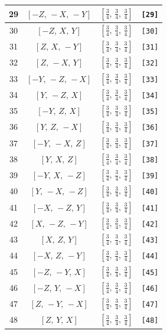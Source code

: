 \documentclass[fleqn,8pt]{jsarticle}
\begin{document}
\begin{longtable}{cccc}
29 & $\left[ - Z,\, - X,\, - Y \right]$ & $\left[ \frac{3}{4},\, \frac{3}{4},\, \frac{3}{4} \right]$ & {\tt [29]} \\ \hline
30 & $\left[ - Z,\, X,\, Y \right]$ & $\left[ \frac{3}{4},\, \frac{3}{4},\, \frac{3}{4} \right]$ & {\tt [30]} \\ \hline
31 & $\left[ Z,\, X,\, - Y \right]$ & $\left[ \frac{3}{4},\, \frac{3}{4},\, \frac{3}{4} \right]$ & {\tt [31]} \\ \hline
32 & $\left[ Z,\, - X,\, Y \right]$ & $\left[ \frac{3}{4},\, \frac{3}{4},\, \frac{3}{4} \right]$ & {\tt [32]} \\ \hline
33 & $\left[ - Y,\, - Z,\, - X \right]$ & $\left[ \frac{3}{4},\, \frac{3}{4},\, \frac{3}{4} \right]$ & {\tt [33]} \\ \hline
34 & $\left[ Y,\, - Z,\, X \right]$ & $\left[ \frac{3}{4},\, \frac{3}{4},\, \frac{3}{4} \right]$ & {\tt [34]} \\ \hline
35 & $\left[ - Y,\, Z,\, X \right]$ & $\left[ \frac{3}{4},\, \frac{3}{4},\, \frac{3}{4} \right]$ & {\tt [35]} \\ \hline
36 & $\left[ Y,\, Z,\, - X \right]$ & $\left[ \frac{3}{4},\, \frac{3}{4},\, \frac{3}{4} \right]$ & {\tt [36]} \\ \hline
37 & $\left[ - Y,\, - X,\, Z \right]$ & $\left[ \frac{3}{4},\, \frac{3}{4},\, \frac{3}{4} \right]$ & {\tt [37]} \\ \hline
38 & $\left[ Y,\, X,\, Z \right]$ & $\left[ \frac{3}{4},\, \frac{3}{4},\, \frac{3}{4} \right]$ & {\tt [38]} \\ \hline
39 & $\left[ - Y,\, X,\, - Z \right]$ & $\left[ \frac{3}{4},\, \frac{3}{4},\, \frac{3}{4} \right]$ & {\tt [39]} \\ \hline
40 & $\left[ Y,\, - X,\, - Z \right]$ & $\left[ \frac{3}{4},\, \frac{3}{4},\, \frac{3}{4} \right]$ & {\tt [40]} \\ \hline
41 & $\left[ - X,\, - Z,\, Y \right]$ & $\left[ \frac{3}{4},\, \frac{3}{4},\, \frac{3}{4} \right]$ & {\tt [41]} \\ \hline
42 & $\left[ X,\, - Z,\, - Y \right]$ & $\left[ \frac{3}{4},\, \frac{3}{4},\, \frac{3}{4} \right]$ & {\tt [42]} \\ \hline
43 & $\left[ X,\, Z,\, Y \right]$ & $\left[ \frac{3}{4},\, \frac{3}{4},\, \frac{3}{4} \right]$ & {\tt [43]} \\ \hline
44 & $\left[ - X,\, Z,\, - Y \right]$ & $\left[ \frac{3}{4},\, \frac{3}{4},\, \frac{3}{4} \right]$ & {\tt [44]} \\ \hline
45 & $\left[ - Z,\, - Y,\, X \right]$ & $\left[ \frac{3}{4},\, \frac{3}{4},\, \frac{3}{4} \right]$ & {\tt [45]} \\ \hline
46 & $\left[ - Z,\, Y,\, - X \right]$ & $\left[ \frac{3}{4},\, \frac{3}{4},\, \frac{3}{4} \right]$ & {\tt [46]} \\ \hline
47 & $\left[ Z,\, - Y,\, - X \right]$ & $\left[ \frac{3}{4},\, \frac{3}{4},\, \frac{3}{4} \right]$ & {\tt [47]} \\ \hline
48 & $\left[ Z,\, Y,\, X \right]$ & $\left[ \frac{3}{4},\, \frac{3}{4},\, \frac{3}{4} \right]$ & {\tt [48]} \\
\end{longtable}
\end{document}
